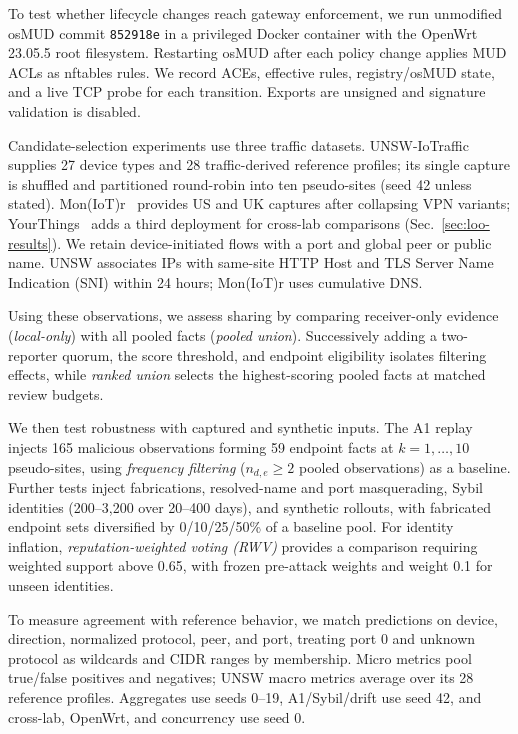 \documentclass[journal]{IEEEtran}
\theoremstyle{definition}
\begin{document}
To test whether lifecycle changes reach gateway enforcement, we run unmodified osMUD commit \texttt{852918e} in a privileged Docker container with the OpenWrt 23.05.5 root filesystem. Restarting osMUD after each policy change applies MUD ACLs as nftables rules. We record ACEs, effective rules, registry/osMUD state, and a live TCP probe for each transition. Exports are unsigned and signature validation is disabled.

Candidate-selection experiments use three traffic datasets. UNSW-IoTraffic~\cite{sivanathan2019classifying} supplies 27 device types and 28 traffic-derived reference profiles; its single capture is shuffled and partitioned round-robin into ten pseudo-sites (seed 42 unless stated). Mon(IoT)r~\cite{moniotr} provides US and UK captures after collapsing VPN variants; YourThings~\cite{alrawi2019yourthings} adds a third deployment for cross-lab comparisons (Sec.~\ref{sec:loo-results}). We retain device-initiated flows with a port and global peer or public name. UNSW associates IPs with same-site HTTP Host and TLS Server Name Indication (SNI) within 24 hours; Mon(IoT)r uses cumulative DNS.

Using these observations, we assess sharing by comparing receiver-only evidence (\emph{local-only}) with all pooled facts (\emph{pooled union}). Successively adding a two-reporter quorum, the score threshold, and endpoint eligibility isolates filtering effects, while \emph{ranked union} selects the highest-scoring pooled facts at matched review budgets.

We then test robustness with captured and synthetic inputs. The A1 replay injects 165 malicious observations forming 59 endpoint facts at $k=1,\ldots,10$ pseudo-sites, using \emph{frequency filtering} ($n_{d,e}\ge2$ pooled observations) as a baseline. Further tests inject fabrications, resolved-name and port masquerading, Sybil identities (200--3,200 over 20--400 days), and synthetic rollouts, with fabricated endpoint sets diversified by 0/10/25/50\% of a baseline pool. For identity inflation, \emph{reputation-weighted voting (RWV)} provides a comparison requiring weighted support above 0.65, with frozen pre-attack weights and weight 0.1 for unseen identities.

To measure agreement with reference behavior, we match predictions on device, direction, normalized protocol, peer, and port, treating port 0 and unknown protocol as wildcards and CIDR ranges by membership. Micro metrics pool true/false positives and negatives; UNSW macro metrics average over its 28 reference profiles. Aggregates use seeds 0--19, A1/Sybil/drift use seed 42, and cross-lab, OpenWrt, and concurrency use seed 0.
\end{document}
